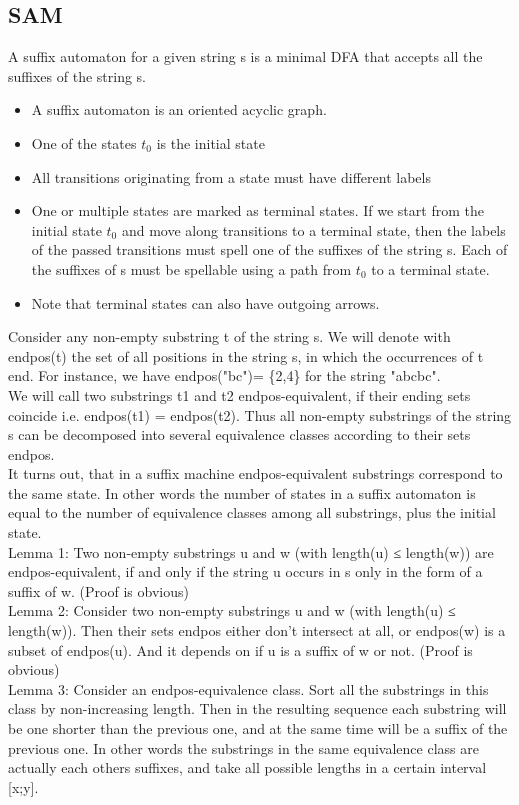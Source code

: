 \documentclass[8pt, a4paper, oneside, twocolumn]{extarticle}
\begin{document}
\subsection{SAM}
A suffix automaton for a given string s is a minimal DFA that accepts all the suffixes of the string s.
\begin{itemize}
	\item A suffix automaton is an oriented acyclic graph.
	\item One of the states $t_0$ is the initial state
	\item All transitions originating from a state must have different labels
	\item One or multiple states are marked as terminal states. If we start from the initial state $t_0$ and move along transitions to a terminal state, then the labels of the passed transitions must spell one of the suffixes of the string s. Each of the suffixes of s must be spellable using a path from $t_0$ to a terminal state.
    \item Note that terminal states can also have outgoing arrows.
\end{itemize}
Consider any non-empty substring t of the string s. We will denote with endpos(t) the set of all positions in the string s, in which the occurrences of t end. For instance, we have endpos("bc")= \{2,4\} for the string "abcbc".\\
We will call two substrings t1 and t2 endpos-equivalent, if their ending sets coincide i.e. endpos(t1) = endpos(t2). Thus all non-empty substrings of the string s can be decomposed into several equivalence classes according to their sets endpos.\\
It turns out, that in a suffix machine endpos-equivalent substrings correspond to the same state. In other words the number of states in a suffix automaton is equal to the number of equivalence classes among all substrings, plus the initial state.\\
Lemma 1: Two non-empty substrings u and w (with length(u) ≤ length(w)) are endpos-equivalent, if and only if the string u occurs in s only in the form of a suffix of w. (Proof is obvious)\\
Lemma 2: Consider two non-empty substrings u and w (with length(u) ≤ length(w)). Then their sets endpos either don't intersect at all, or endpos(w) is a subset of endpos(u). And it depends on if u is a suffix of w or not. (Proof is obvious)\\
Lemma 3: Consider an endpos-equivalence class. Sort all the substrings in this class by non-increasing length. Then in the resulting sequence each substring will be one shorter than the previous one, and at the same time will be a suffix of the previous one. In other words the substrings in the same equivalence class are actually each others suffixes, and take all possible lengths in a certain interval [x;y].\\
\end{document}
